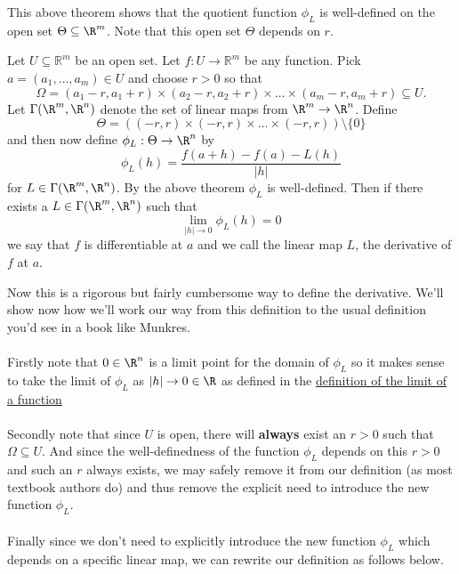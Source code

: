 		
		\begin{remark}
			This above theorem shows that the quotient function $\phi_L$ is well-defined on the open set $\Theta \subseteq \R^m$. Note that this open set $\Theta$ depends on $r$.
		\end{remark}
		
			\begin{definition}
				Let $U \subseteq \mathbb{R}^m$ be an open set. Let $f : U \to \mathbb{R}^m$ be any function. Pick $a = (a_1, \dots, a_m) \in U$ and choose $r > 0$ so that $$\Omega = \left(a_1 - r, a_1 + r \right) \times \left(a_2 - r, a_2 + r \right) \times \dots \times \left(a_m - r, a_m + r \right)   \subseteq U.$$ Let $\Gamma(\R^m, \R^n)$ denote the set of linear maps from $\R^m \to \R^n$. Define $$\Theta = \left((-r, r) \times (-r, r) \times \dots \times (-r, r) \right) \setminus \{0\}$$  and then now define $\phi_L : \Theta \to \R^n$ by $$\phi_L(h) = \frac{f(a+h) - f(a) - L(h)}{|h|}$$ for $L \in \Gamma(\R^m, \R^n)$. By the above theorem $\phi_L$ is well-defined. Then if there exists a $L \in \Gamma(\R^m, \R^n)$ such that $$\lim_{|h| \to 0} \phi_L(h) = 0$$ we say that $f$ is differentiable at $a$ and we call the linear map $L$, the derivative of $f$ at $a$.
			\end{definition}
		
		\begin{remark}
			Now this is a rigorous but fairly cumbersome way to define the derivative. We'll show now how we'll work our way from this definition to the usual definition you'd see in a book like Munkres. 
			\\ \\
			Firstly note that $0 \in \R^n$ is a  limit point for the domain of $\phi_L$ so it makes sense to take the limit of $\phi_L$ as $|h| \to 0 \in \R$ as defined in the \hyperlink{limit-function-defn}{definition of the limit of a function}
			\\ \\
			Secondly note that since $U$ is open, there will \textbf{always} exist an $r > 0$ such that $\Omega \subseteq U$. And since the well-definedness of the function $\phi_L$ depends on this $r > 0$ and such an $r$ always exists, we may safely remove it from our definition (as most textbook authors do) and thus remove the explicit need to introduce the new function $\phi_L$. 
			\\ \\
			Finally since we don't need to explicitly introduce the new function $\phi_L$ which depends on a specific linear map, we can rewrite our definition as follows below.
		\end{remark} 
		
